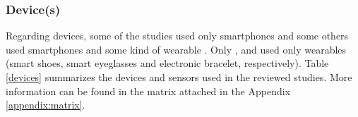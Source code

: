 \subsubsection{Device(s)}

Regarding devices, some of the studies used only smartphones \cite{Intarasirisawat2020,Phan2020211,Mitchell2020297,Suffoletto2020505,Wakana2019,Willoughby2019496,Garnett2019296,Chatterjee2018,Leightley2018,Poulton201835,Mariakakis2018,Suffoletto2018116,Bertholet2017285,Mellentin2017} and some others used smartphones and some kind of wearable \cite{Li2021,Businelle2020,Leightley2020,Killian201935,Leonard2017}. Only \cite{Park201774}, \cite{Sempionatto2019161} and \cite{Kinnamon2017} used only wearables (smart shoes, smart eyeglasses and electronic bracelet, respectively). Table \ref{devices} summarizes the devices and sensors used in the reviewed studies. More information can be found in the matrix attached in the Appendix \ref{appendix:matrix}.

